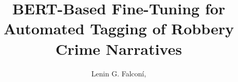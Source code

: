 \documentclass[onecolumn, journal, english, 12pt, a4paper]{IEEEtran} %
\theoremstyle{definition}
\begin{document}
%
\title{BERT-Based Fine-Tuning for Automated Tagging of Robbery Crime Narratives}
%
%
%

\author{Lenin G. Falconí,%
}

% 
%
\end{document}
